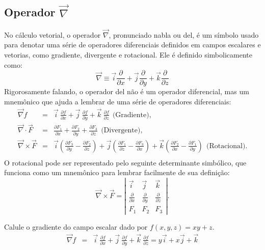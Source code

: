 \subsection{Operador $\vec{\nabla}$}
No cálculo vetorial, o operador $\vec{\nabla}$, pronunciado nabla ou del, é um símbolo usado para denotar uma série de operadores diferenciais definidos em campos escalares e vetorias, como gradiente, divergente e rotacional. Ele é definido simbolicamente como:
\begin{equation}\label{def_del}
\vec{\nabla} \equiv \vec{i}\frac{\partial}{\partial x}+\vec{j}\frac{\partial}{\partial y}+\vec{k}\frac{\partial}{\partial z}
\end{equation}
Rigorosamente falando, o operador del não é um operador diferencial, mas um mnemônico que ajuda a lembrar de uma série de operadores diferenciais:
\begin{eqnarray*}
 \vec{\nabla}f &=& \vec{i}~\!\frac{\partial f}{\partial x}+\vec{j}~\!\frac{\partial f}{\partial y}+\vec{k}~\!\frac{\partial f}{\partial z} ~~ \text{(Gradiente)},\\
 \vec{\nabla}\cdot \vec{F} &=& \frac{\partial F_1}{\partial x}+\frac{\partial F_2}{\partial y}+\frac{\partial F_3}{\partial z} ~~ \text{(Divergente)},\\
 \vec{\nabla}\times \vec{F} &=&  \vec{i}\left(\frac{\partial F_3}{\partial y}-\frac{\partial F_2}{\partial z}\right) + \vec{j}\left(\frac{\partial F_1}{\partial z}-\frac{\partial F_3}{\partial x}\right) + \vec{k}\left(\frac{\partial F_2}{\partial x}-\frac{\partial F_1}{\partial y}\right)~~ \text{(Rotacional)}.\\
\end{eqnarray*}
O rotacional pode ser representado pelo seguinte determinante simbólico, que funciona como um mnemônico para lembrar facilmente de sua definição:
$$
 \vec{\nabla}\times \vec{F}=\left|
 \begin{array}{ccc}
 \vec{i} & \vec{j} & \vec{k} \\
 \frac{\partial}{\partial x} &\frac{\partial}{\partial y} &\frac{\partial}{\partial z} \\
F_1 & F_2 & F_3
 \end{array}
\right|.
$$

\begin{ex} Calule o gradiente do campo escalar dado por $f(x,y,z)=xy+z$.
\begin{eqnarray}
 \vec{\nabla}f &=& \vec{i}~\!\frac{\partial f}{\partial x}+\vec{j}~\!\frac{\partial f}{\partial y}+\vec{k}~\!\frac{\partial f}{\partial z}
 =y\vec{i}+x\vec{j}+\vec{k}
\end{eqnarray}
\end{ex}

